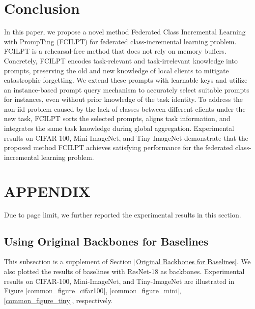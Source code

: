 \documentclass[sigconf,anonymous,review,screen]{acmart}
\begin{document}
\section{Conclusion}
In this paper, we propose a novel method  Federated Class Incremental Learning with PrompTing (FCILPT) for federated class-incremental learning problem. FCILPT is a rehearsal-free method that does not rely on memory buffers. Concretely, FCILPT encodes task-relevant and task-irrelevant knowledge into prompts, preserving the old and new knowledge of local clients to mitigate catastrophic forgetting. We extend these prompts with learnable keys and utilize an instance-based prompt query mechanism to accurately select suitable prompts for instances, even without prior knowledge of the task identity. To address the non-iid problem caused by the lack of classes between different clients under the new task, FCILPT sorts the selected prompts, aligns task information, and integrates the same task knowledge during global aggregation. Experimental results on CIFAR-100, Mini-ImageNet, and Tiny-ImageNet demonstrate that the proposed method FCILPT achieves satisfying performance for the federated class-incremental learning problem.


\clearpage


\balance





\clearpage



\appendix

\section{APPENDIX}
Due to page limit, we further reported the experimental results in this section.


\subsection{Using Original Backbones for Baselines}
This subsection is  a supplement of Section \ref{Original Backbones for Baselines}. We also plotted the results of baselines with ResNet-18 as backbones. Experimental results 
on CIFAR-100, Mini-ImageNet, and Tiny-ImageNet are illustrated in Figure \ref{common_figure_cifar100}, \ref{common_figure_mini}, \ref{common_figure_tiny}, respectively.
\end{document}
